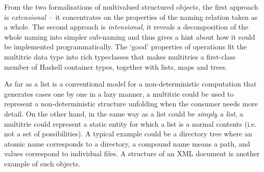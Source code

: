 \documentclass{article}
\theoremstyle{definition}
\begin{document}
From the two formalisations of multivalued structured objects, the first
approach is \emph{extensional}~-- it concentrates on the properties of the
naming relation taken as a whole. The second approach is \emph{intensional}, it
reveals a decomposition of the whole naming into simpler sub-naming and thus
gives a hint about how it could be implemented programmatically.  The `good'
properties of operations fit the multitrie data type into rich typeclasses that
makes multitries a first-class member of Haskell container types, together with
lists, maps and trees.

As far as a list is a conventional model for a non-deterministic computation
that generates cases one by one in a lazy manner, a multitrie could be used to
represent a non-deterministic structure unfolding when the consumer needs more
detail.  On the other hand, in the same way as a list could be \emph{simply a
list}, a multitrie could represent a static entity for which a list is a normal
contents (i.e. not a set of possibilities). A typical example could be a
directory tree where an atomic name corresponds to a directory, a compound name
means a path, and values correspond to individual files.  A structure of an XML
document is another example of such objects.
\end{document}
